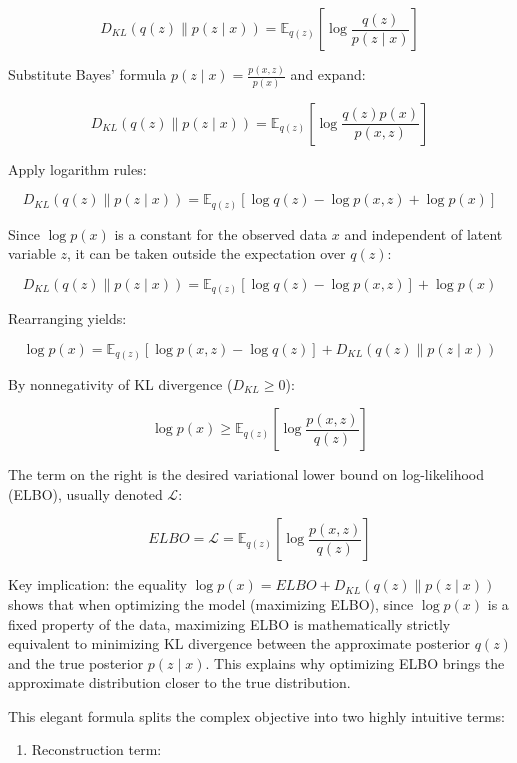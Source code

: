 \[
D_{KL}(q(z)\parallel p(z\mid x))=\mathbb{E}_{q(z)}\left[\log\frac{q(z)}{p(z\mid x)}\right]
\]

Substitute Bayes' formula \(p(z\mid x)=\frac{p(x,z)}{p(x)}\) and expand:

\[
D_{KL}(q(z)\parallel p(z\mid x))=\mathbb{E}_{q(z)}\left[\log\frac{q(z)p(x)}{p(x,z)}\right]
\]

Apply logarithm rules:

\[
D_{KL}(q(z)\parallel p(z\mid x))=\mathbb{E}_{q(z)}[\log q(z)-\log p(x,z)+\log p(x)]
\]

Since \(\log p(x)\) is a constant for the observed data \(x\) and independent of latent variable \(z\), it can be taken outside the expectation over \(q(z)\):

\[
D_{KL}(q(z)\parallel p(z\mid x))=\mathbb{E}_{q(z)}[\log q(z)-\log p(x,z)]+\log p(x)
\]

Rearranging yields:

\[
\log p(x)=\mathbb{E}_{q(z)}[\log p(x,z)-\log q(z)]+D_{KL}(q(z)\parallel p(z\mid x))
\]

By nonnegativity of KL divergence (\(D_{KL}\ge 0\)):

\[
\log p(x)\ge \mathbb{E}_{q(z)}\left[\log\frac{p(x,z)}{q(z)}\right]
\]

The term on the right is the desired variational lower bound on log-likelihood (ELBO), usually denoted \(\mathcal{L}\):

\[
ELBO=\mathcal{L}=\mathbb{E}_{q(z)}\left[\log\frac{p(x,z)}{q(z)}\right]
\]

Key implication: the equality \(\log p(x)=ELBO+D_{KL}(q(z)\parallel p(z\mid x))\) shows that when optimizing the model (maximizing ELBO), since \(\log p(x)\) is a fixed property of the data, maximizing ELBO is mathematically strictly equivalent to minimizing KL divergence between the approximate posterior \(q(z)\) and the true posterior \(p(z\mid x)\). This explains why optimizing ELBO brings the approximate distribution closer to the true distribution.

This elegant formula splits the complex objective into two highly intuitive terms:

\begin{enumerate}
\def\labelenumi{\arabic{enumi}.}
\tightlist
\item
{}
  Reconstruction term:
\end{enumerate}

